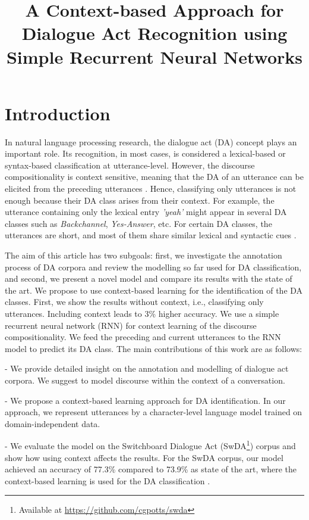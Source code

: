 \documentclass[10pt, a4paper]{article}
\title{A Context-based Approach for Dialogue Act Recognition using Simple Recurrent Neural Networks}
\begin{document}
\maketitleabstract

\section{Introduction}

In natural language processing research, the dialogue act (DA) concept plays an important role.
Its recognition, in most cases, is considered a lexical-based or syntax-based classification at utterance-level.
However, the discourse compositionality is context sensitive, meaning that the DA of an utterance can be elicited from the preceding utterances \cite{grosz1982discourse}. 
Hence, classifying only utterances is not enough because their DA class arises from their context. 
For example, the utterance containing only the lexical entry \textit{'yeah'} might appear in several DA classes such as \textit{Backchannel}, \textit{Yes-Answer}, etc.
For certain DA classes, the utterances are short, and most of them share similar lexical and syntactic cues \cite{Jurafsky1998}.

The aim of this article has two subgoals: first, we investigate the annotation process of DA corpora and review the modelling so far used for DA classification, and second, we present a novel model and compare its results with the state of the art.
We propose to use context-based learning for the identification of the DA classes. 
First, we show the results without context, i.e., classifying only utterances. Including context leads to 3\% higher accuracy. We use a simple recurrent neural network (RNN) for context learning of the discourse compositionality. 
We feed the preceding and current utterances to the RNN model to predict its DA class.
The main contributions of this work are as follows:

- We provide detailed insight on the annotation and modelling of dialogue act corpora. 
We suggest to model discourse within the context of a conversation.

- We propose a context-based learning approach for DA identification. In our approach, we represent utterances by a character-level language model trained on domain-independent data.

- We evaluate the model on the Switchboard Dialogue Act (SwDA\footnote{Available at \url{https://github.com/cgpotts/swda}}) corpus and show how using context affects the results. For the SwDA corpus, our model achieved an accuracy of 77.3\% compared to 73.9\% as state of the art, where the context-based learning is used for the DA classification \cite{kalchbrenner2013recurrent}.
\end{document}
